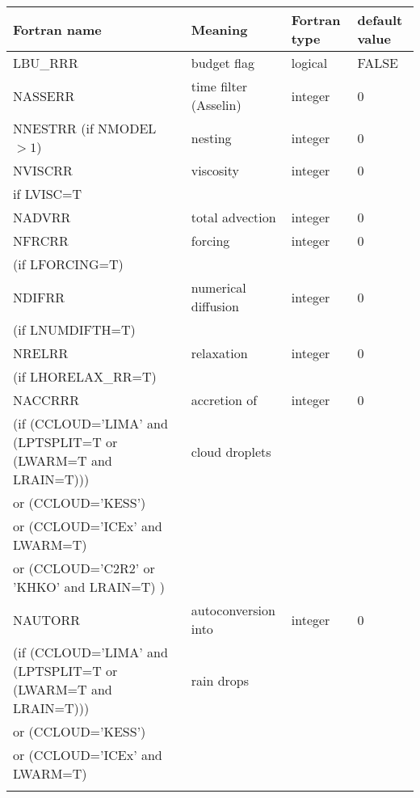 \begin{longtable} {|p{}|p{}|>{\centering}p{}|p{}<{\centering}|}
\hline
Fortran name & Meaning & Fortran type & default value \\
\hline \hline
\endhead
LBU\_RRR & budget flag & logical & FALSE\index{LBU\_RRR!\innam{NAM\_BU\_RRR}} \\\hline
NASSERR  & time filter (Asselin)   & integer  &  0 \index{NASSERR!\innam{NAM\_BU\_RRR}} \\\hline
NNESTRR (if NMODEL$>1$) & nesting           & integer  &  0 \index{NNESTRR!\innam{NAM\_BU\_RRR}} \\\hline
NVISCRR  & viscosity         & integer  &  0 \index{NVISCRR!\innam{NAM\_BU\_RRR}}\\
if LVISC=T &  &   &   \\\hline
NADVRR   & total advection   & integer  &  0 \index{NADVRR!\innam{NAM\_BU\_RRR}}\\\hline
NFRCRR   & forcing           & integer  &  0 \index{NFRCRR!\innam{NAM\_BU\_RRR}} \\ \nopagebreak
(if LFORCING=T) &  &   &   \\\hline
NDIFRR   & numerical diffusion & integer  &  0 \index{NDIFRR!\innam{NAM\_BU\_RRR}}\\ \nopagebreak
(if LNUMDIFTH=T) &  &   &   \\\hline
NRELRR   & relaxation        & integer  &  0 \index{NRELRR!\innam{NAM\_BU\_RRR}}\\ \nopagebreak
(if LHORELAX\_RR=T) &  &   &   \\\hline
NACCRRR  & accretion of & integer  &  0 \index{NACCRRR!\innam{NAM\_BU\_RRR}}\\ \nopagebreak
(if (CCLOUD='LIMA' and (LPTSPLIT=T or (LWARM=T and LRAIN=T))) & cloud droplets & & \\ \nopagebreak
 or (CCLOUD='KESS') & & & \\ \nopagebreak
 or (CCLOUD='ICEx' and LWARM=T) & & & \\ \nopagebreak
 or (CCLOUD='C2R2' or 'KHKO' and LRAIN=T) ) & & & \\ \hline
NAUTORR   & autoconversion into & integer  &  0 \index{NAUTORR!\innam{NAM\_BU\_RRR}}\\ \nopagebreak
(if (CCLOUD='LIMA' and (LPTSPLIT=T or (LWARM=T and LRAIN=T))) & rain drops & & \\ \nopagebreak
 or (CCLOUD='KESS') & & & \\ \nopagebreak
 or (CCLOUD='ICEx' and LWARM=T) & & & \\ \nopagebreak

\end{longtable}

